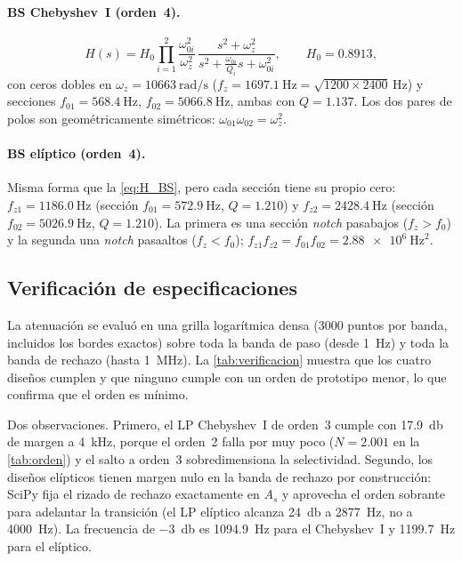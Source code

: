 \paragraph{BS Chebyshev~I (orden~4).}
\begin{equation}
  H(s) = H_0 \prod_{i=1}^{2} \frac{\omega_{0i}^2}{\omega_z^2}\,\frac{s^2+\omega_z^2}{s^2 + \frac{\omega_{0i}}{Q_i}s + \omega_{0i}^2},
  \qquad H_0 = \num{0.8913},
  \label{eq:H_BS}
\end{equation}
con ceros dobles en $\omega_z = \qty{10663}{\radian\per\second}$ ($f_z = \qty{1697.1}{\hertz} = \sqrt{1200\times2400}$\,Hz) y secciones
$f_{01} = \qty{568.4}{\hertz}$, $f_{02} = \qty{5066.8}{\hertz}$, ambas con $Q = \num{1.137}$. Los dos pares de polos son geométricamente
simétricos: $\omega_{01}\omega_{02} = \omega_z^2$.

\paragraph{BS elíptico (orden~4).} Misma forma que la \cref{eq:H_BS}, pero cada sección tiene su propio cero:
$f_{z1} = \qty{1186.0}{\hertz}$ (sección $f_{01} = \qty{572.9}{\hertz}$, $Q = \num{1.210}$) y $f_{z2} = \qty{2428.4}{\hertz}$ (sección
$f_{02} = \qty{5026.9}{\hertz}$, $Q = \num{1.210}$). La primera es una sección \emph{notch} pasabajos ($f_z > f_0$) y la segunda una
\emph{notch} pasaaltos ($f_z < f_0$); $f_{z1}f_{z2} = f_{01}f_{02} = \qty{2.88e6}{\hertz\squared}$.

\subsection{Verificación de especificaciones}

La atenuación se evaluó en una grilla logarítmica densa (\num{3000} puntos por banda, incluidos los bordes exactos) sobre toda la banda de
paso (desde \qty{1}{\hertz}) y toda la banda de rechazo (hasta \qty{1}{\mega\hertz}). La \cref{tab:verificacion} muestra que los cuatro
diseños cumplen y que ninguno cumple con un orden de prototipo menor, lo que confirma que el orden es mínimo.

\begin{table}[H]
  \centering
  \caption{Verificación de la plantilla. Margen: $A_{s,\min} - A_s$.}
  \label{tab:verificacion}
  \footnotesize
\end{table}

Dos observaciones. Primero, el LP Chebyshev~I de orden~3 cumple con \qty{17.9}{\decibel} de margen a \qty{4}{\kilo\hertz}, porque el orden~2
falla por muy poco ($N = \num{2.001}$ en la \cref{tab:orden}) y el salto a orden~3 sobredimensiona la selectividad. Segundo, los diseños
elípticos tienen margen nulo en la banda de rechazo por construcción: SciPy fija el rizado de rechazo exactamente en $A_s$ y aprovecha
el orden sobrante para adelantar la transición (el LP elíptico alcanza \qty{24}{\decibel} a \qty{2877}{\hertz}, no a \qty{4000}{\hertz}).
La frecuencia de \qty{-3}{\decibel} es \qty{1094.9}{\hertz} para el Chebyshev~I y \qty{1199.7}{\hertz} para el elíptico.

